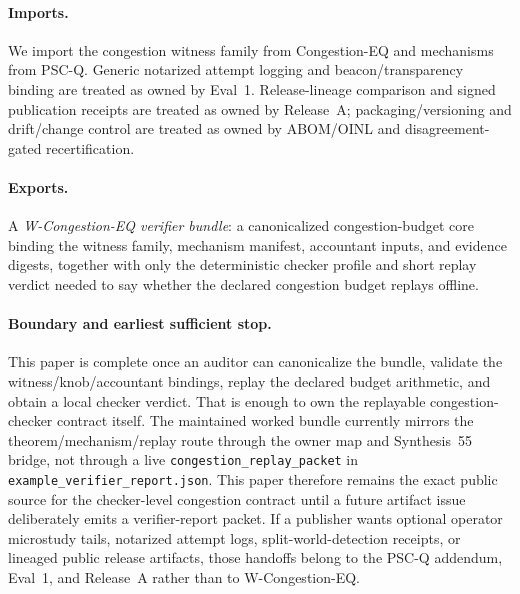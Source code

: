 \documentclass[11pt]{article}
\begin{document}
\paragraph{Imports.}
We import the congestion witness family from Congestion-EQ and mechanisms from PSC-Q.\cite{series:congeq,series:pscq}
Generic notarized attempt logging and beacon/transparency binding are treated as owned by Eval~1.\cite{series:evalnotary}
Release-lineage comparison and signed publication receipts are treated as owned by Release~A; packaging/versioning and drift/change control are treated as owned by ABOM/OINL and disagreement-gated recertification.\cite{series:release,series:abom,series:recert}

\paragraph{Exports.}
A \emph{W-Congestion-EQ verifier bundle}: a canonicalized congestion-budget core binding the witness family, mechanism manifest, accountant inputs, and evidence digests, together with only the deterministic checker profile and short replay verdict needed to say whether the declared congestion budget replays offline.

\paragraph{Boundary and earliest sufficient stop.}
This paper is complete once an auditor can canonicalize the bundle, validate the witness/knob/accountant bindings, replay the declared budget arithmetic, and obtain a local checker verdict.
That is enough to own the replayable congestion-checker contract itself. The maintained worked bundle currently mirrors the theorem/mechanism/replay route through the owner map and Synthesis~55 bridge, not through a live \nolinkurl{congestion\_replay\_packet} in \nolinkurl{example\_verifier\_report.json}. This paper therefore remains the exact public source for the checker-level congestion contract until a future artifact issue deliberately emits a verifier-report packet.
If a publisher wants optional operator microstudy tails, notarized attempt logs, split-world-detection receipts, or lineaged public release artifacts, those handoffs belong to the PSC-Q addendum, Eval~1, and Release~A rather than to W-Congestion-EQ.\cite{series:workedexample,series:seriesspines,series:pscqaddendum,series:evalnotary,series:release}
\end{document}
